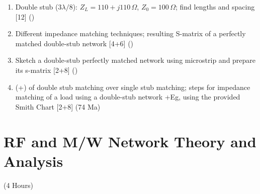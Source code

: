 \documentclass[12pt]{article}
\begin{document}
\begin{enumerate}[topsep=0pt, noitemsep]
      \item Double stub ($3\lambda/8$): $Z_L = 110{+}j110\,\Omega$, $Z_0 = 100\,\Omega$; find lengths and spacing \hfill [12] ()
      \item Different impedance matching techniques; resulting S-matrix of a perfectly matched double-stub network \hfill [4+6] ()
      \item Sketch a double-stub perfectly matched network using microstrip and prepare its s-matrix \hfill [2+8] ()
      \item (+) of double stub matching over single stub matching; steps for impedance matching of a load using a double-stub network +Eg, using the provided Smith Chart \hfill [2+8] (74 Ma)
    \end{enumerate}

\pagebreak
\section{RF and M/W Network Theory and Analysis}
\begin{center}(4 Hours)\end{center}
\end{document}
